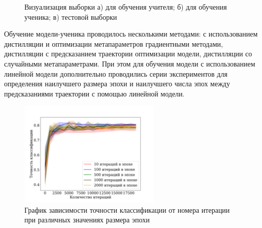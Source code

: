 \documentclass[12pt, twoside]{article}
\begin{document}
\begin{figure}[!ht]
{\begin{minipage}[h]{0.5\linewidth}
\end{minipage}}
\caption{Визуализация выборки а) для обучения учителя; б) для обучения ученика; в) тестовой выборки}
\label{fig:synt_data}
\end{figure}


Обучение модели-ученика проводилось несколькими методами: с использованием дистилляции и оптимизации метапараметров градиентными методами, дистилляции с предсказанием траектории оптимизации модели, дистилляции со случайными метапараметрами. При этом для обучения модели с использованием линейной модели дополнительно проводились серии экспериментов для определения наилучшего размера эпохи и наилучшего числа эпох между предсказаниями траектории с помощью линейной модели.

\begin{figure}[!ht]
\centering
\includegraphics[width=0.6\textwidth]{linear_epoch_size.pdf}
\caption{График зависимости точности классификации от номера итерации при различных значениях размера эпохи}
\label{fig:epoch_size}
\end{figure}
\end{document}
